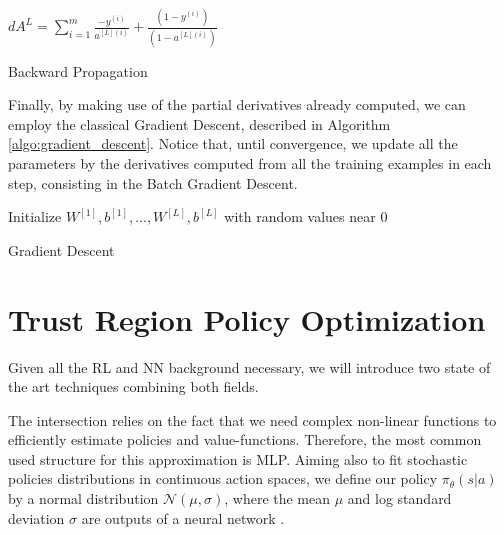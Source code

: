 \begin{algorithm}[H]
    \DontPrintSemicolon
    \SetAlgoLined
    $dA^{L} = \sum_{i=1}^m{\frac{-y^{(i)}}{a^{[L](i)}} + \frac{(1-y^{(i)})}{(1-a^{[L](i)})}}$\;
    \caption{Backward Propagation}
    \label{algo:backward_propagation}
\end{algorithm}

Finally, by making use of the partial derivatives already computed, we can employ the classical Gradient Descent, described in Algorithm \ref{algo:gradient_descent}. Notice that, until convergence, we update all the parameters by the derivatives computed from all the training examples in each step, consisting in the Batch Gradient Descent.

\begin{algorithm}[H]
    \DontPrintSemicolon
    \SetAlgoLined
    Initialize $W^{[1]},b^{[1]},...,W^{[L]},b^{[L]}$ with random values near $0$\;
    \caption{Gradient Descent}
    \label{algo:gradient_descent}
\end{algorithm}


\section{Trust Region Policy Optimization}

Given all the RL and NN background necessary, we will introduce two state of the art techniques combining both fields.

The intersection relies on the fact that we need complex non-linear functions to efficiently estimate policies and value-functions. Therefore, the most common used structure for this approximation is MLP. Aiming also to fit stochastic policies distributions in continuous action spaces, we define our policy $\pi_{\theta}(s|a)$ by a normal distribution $\mathcal{N}(\mu,\sigma)$, where the mean $\mu$ and log standard deviation $\sigma$ are outputs of a neural network \cite{TRPO}.

